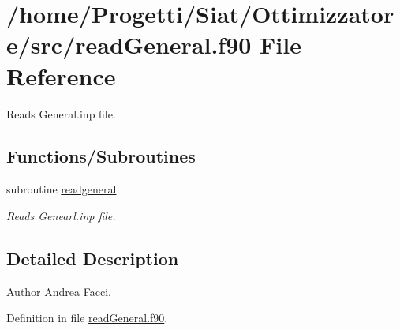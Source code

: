 \hypertarget{read_general_8f90}{\section{/home/\-Progetti/\-Siat/\-Ottimizzatore/src/read\-General.f90 File Reference}
\label{read_general_8f90}
}


Reads General.\-inp file.  


\subsection*{Functions/\-Subroutines}
\begin{DoxyCompactItemize}
\item 
subroutine \hyperlink{read_general_8f90_a7f63c840fdfc061f2289fb0106adc2d0}{readgeneral}
\begin{DoxyCompactList}\small\item\em Reads Genearl.\-inp file. \end{DoxyCompactList}\end{DoxyCompactItemize}


\subsection{Detailed Description}
\begin{DoxyAuthor}{Author}
Andrea Facci. 
\end{DoxyAuthor}


Definition in file \hyperlink{read_general_8f90_source}{read\-General.\-f90}.



